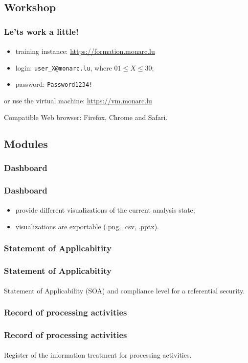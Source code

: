 \subsection{Workshop}
\begin{frame}
  \frametitle{Le'ts work a little!}
  \framesubtitle{}
  \begin{itemize}
    \item training instance: \url{https://formation.monarc.lu}
    \item login: \texttt{user\_X@monarc.lu}, where $01 \leq X \leq 30$;
    \item password: \texttt{Password1234!}
  \end{itemize}

  \bigskip

  or use the virtual machine: \url{https://vm.monarc.lu}

  \bigskip
  Compatible Web browser: Firefox, Chrome and Safari.
\end{frame}



\subsection{Modules}
\subsubsection{Dashboard}
\begin{frame}
  \frametitle{Dashboard}
  \framesubtitle{}
  \begin{itemize}
    \item provide different visualizations of the current analysis state;
    \item visualizations are exportable (.png, .csv, .pptx).
  \end{itemize}
\end{frame}

\subsubsection{Statement of Applicabitity}
\begin{frame}
  \frametitle{Statement of Applicabitity}
  \framesubtitle{}
  Statement of Applicability (SOA) and compliance level for a referential security.
\end{frame}

\subsubsection{Record of processing activities}
\begin{frame}
  \frametitle{Record of processing activities}
  \framesubtitle{}
  Register of the information treatment for processing activities.
\end{frame}



